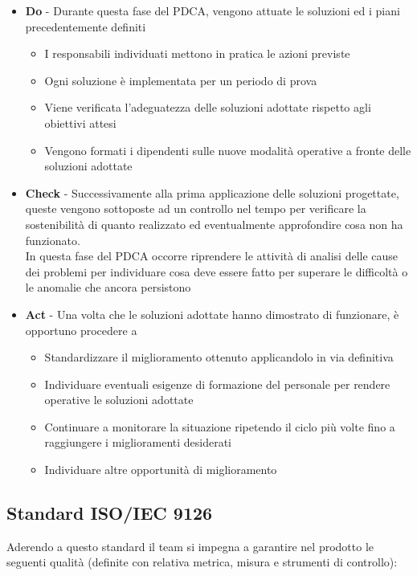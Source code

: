 {\begin{itemize}
  \item  \textbf{Do} - Durante questa fase del PDCA, vengono attuate le soluzioni ed i piani precedentemente definiti
  \begin{itemize}
    \item I responsabili individuati mettono in pratica le azioni previste
    \item Ogni soluzione è implementata per un periodo di prova
    \item Viene verificata l’adeguatezza delle soluzioni adottate rispetto agli obiettivi attesi
    \item Vengono formati i dipendenti sulle nuove modalità operative a fronte delle soluzioni adottate
  \end{itemize}
  
  \item  \textbf{Check} - Successivamente alla prima applicazione delle soluzioni progettate, queste vengono sottoposte ad un controllo nel tempo per verificare la sostenibilità di quanto realizzato ed eventualmente approfondire cosa non ha funzionato.\\
  In questa fase del PDCA occorre riprendere le attività di analisi delle cause dei problemi per individuare cosa deve essere fatto per superare le difficoltà o le anomalie che ancora persistono
  
  \item  \textbf{Act} - Una volta che le soluzioni adottate hanno dimostrato di funzionare, è opportuno procedere a
  \begin{itemize}
    \item Standardizzare il miglioramento ottenuto applicandolo in via definitiva
    \item Individuare eventuali esigenze di formazione del personale per rendere operative le soluzioni adottate
    \item Continuare a monitorare la situazione ripetendo il ciclo più volte fino a raggiungere i miglioramenti desiderati
    \item Individuare altre opportunità di miglioramento
  \end{itemize}
\end{itemize}

\subsection{Standard ISO/IEC 9126}

Aderendo a questo standard il team si impegna a garantire nel prodotto
le seguenti qualità (definite con relativa metrica, misura e
strumenti di controllo): \\




}
